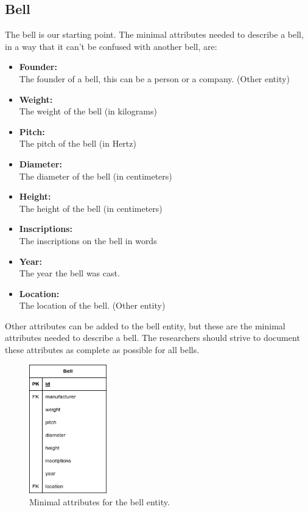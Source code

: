 \documentclass[11pt, a4paper]{article}
\begin{document}
\subsection{Bell}

The bell is our starting point. The minimal attributes needed to describe a bell, in a way that it can't be confused with another bell, are:

\begin{itemize}
    \item \textbf{Founder:} \\
        The founder of a bell, this can be a person or a company. (Other entity)
    \item \textbf{Weight:} \\
        The weight of the bell (in kilograms)
    \item \textbf{Pitch:} \\
        The pitch of the bell (in Hertz)
    \item \textbf{Diameter:} \\
        The diameter of the bell (in centimeters)
    \item \textbf{Height:} \\
        The height of the bell (in centimeters)
    \item \textbf{Inscriptions:} \\
        The inscriptions on the bell in words
    \item \textbf{Year:} \\
        The year the bell was cast.
    \item \textbf{Location:} \\
        The location of the bell. (Other entity)
\end{itemize}

Other attributes can be added to the bell entity, but these are the minimal attributes needed to describe a bell. The researchers should strive to document these attributes as complete as possible for all bells.

\begin{figure}[h!]
    \centering
    \includegraphics[width=0.3\textwidth]{images/bell.png}
    \caption{Minimal attributes for the bell entity.}
    \label{fig:bell-entity}
\end{figure}
\end{document}
